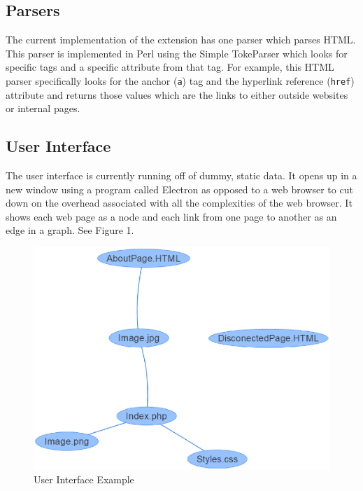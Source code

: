 \documentclass[letterpaper,10pt,titlepage,draftclsnofoot,onecolumn,onesided] {IEEEtran}
\begin{document}
\subsection{Parsers}
The current implementation of the extension has one parser which parses HTML.
This parser is implemented in Perl using the Simple TokeParser which looks for specific tags and a specific attribute from that tag.
For example, this HTML parser specifically looks for the anchor (\verb|a|) tag and the hyperlink reference (\verb|href|) attribute and returns those values which are the links to either outside websites or internal pages.

\subsection{User Interface}
The user interface is currently running off of dummy, static data. 
It opens up in a new window using a program called Electron as opposed to a web browser to cut down on the overhead associated with all the complexities of the web browser.
It shows each web page as a node and each link from one page to another as an edge in a graph. See Figure 1.
\begin{figure}
	\includegraphics[width=450px]{UIMockupEPS}
	\caption{User Interface Example}
\end{figure}
\end{document}
